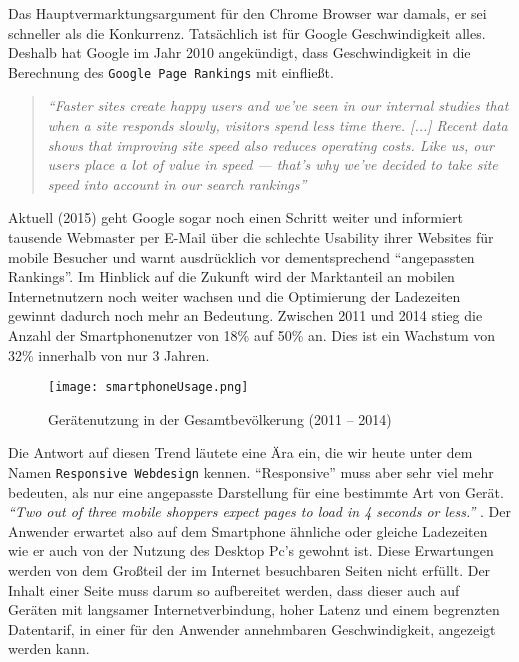 		Das Hauptvermarktungsargument für den Chrome Browser war damals, er sei schneller als die Konkurrenz. Tatsächlich ist für Google Geschwindigkeit alles. Deshalb hat Google im Jahr 2010 angekündigt, dass Geschwindigkeit in die Berechnung des \texttt{Google Page Rankings} mit einfließt.

		\begin{quote}\itshape
			"`Faster sites create happy users and we've seen in our internal studies that when a site responds slowly, visitors spend less time there. [...] Recent data shows that improving site speed also reduces operating costs. Like us, our users place a lot of value in speed — that's why we've decided to take site speed into account in our search rankings"'\autocite{google10}
		\end{quote}

		Aktuell (2015) geht Google sogar noch einen Schritt weiter und informiert tausende Webmaster per E-Mail über die schlechte Usability ihrer Websites für mobile Besucher und warnt ausdrücklich vor dementsprechend "`angepassten Rankings"'.\autocite{t3n15}
		Im Hinblick auf die Zukunft wird der Marktanteil an mobilen Internetnutzern noch weiter wachsen und die Optimierung der Ladezeiten gewinnt dadurch noch mehr an Bedeutung. Zwischen 2011 und 2014 stieg die Anzahl der Smartphonenutzer von 18\% auf 50\% an. Dies ist ein Wachstum von 32\% innerhalb von nur 3 Jahren.\autocite{tns14}\\

		\begin{figure}[htbp]
			\begin{center}
				\texttt{[image: smartphoneUsage.png]}
			\end{center}
			\caption{Gerätenutzung in der Gesamtbevölkerung (2011 – 2014)\autocite{tns14}}
			\label{fig:geraetenutzung}
		\end{figure}

		Die Antwort auf diesen Trend läutete eine Ära ein, die wir heute unter dem Namen \texttt{Responsive Webdesign} kennen. "`Responsive"' muss aber sehr viel mehr bedeuten, als nur eine angepasste Darstellung für eine bestimmte Art von Gerät. \textit{"`Two out of three mobile shoppers expect pages to load in 4 seconds or less."'} \autocite{radware13}. Der Anwender erwartet also auf dem Smartphone ähnliche oder gleiche Ladezeiten wie er auch von der Nutzung des Desktop Pc's gewohnt ist. Diese Erwartungen werden von dem Großteil der im Internet besuchbaren Seiten nicht erfüllt. Der Inhalt einer Seite muss darum so aufbereitet werden, dass dieser auch auf Geräten mit langsamer Internetverbindung, hoher Latenz und einem begrenzten Datentarif, in einer für den Anwender annehmbaren Geschwindigkeit, angezeigt werden kann.\\

